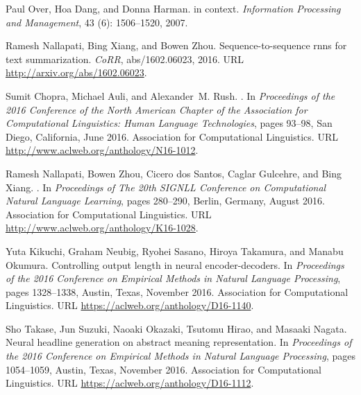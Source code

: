 \documentclass[11pt]{article}
\begin{document}
\begin{thebibliography}{23}
Paul Over, Hoa Dang, and Donna Harman.
 in context.
\newblock \emph{Information Processing and Management}, 43
  (6): 1506--1520, 2007.

Ramesh Nallapati, Bing Xiang, and Bowen Zhou.
\newblock Sequence-to-sequence rnns for text summarization.
\newblock \emph{CoRR}, abs/1602.06023, 2016{}.
\newblock URL \url{http://arxiv.org/abs/1602.06023}.

Sumit Chopra, Michael Auli, and Alexander~M. Rush.
.
\newblock In \emph{Proceedings of the 2016 Conference of the North American
  Chapter of the Association for Computational Linguistics: Human Language
  Technologies}, pages 93--98, San Diego, California, June 2016. Association
  for Computational Linguistics.
\newblock URL \url{http://www.aclweb.org/anthology/N16-1012}.

Ramesh Nallapati, Bowen Zhou, Cicero dos Santos, Caglar Gulcehre, and Bing
  Xiang.
.
\newblock In \emph{Proceedings of The 20th SIGNLL Conference on Computational
  Natural Language Learning}, pages 280--290, Berlin, Germany, August
  2016{}. Association for Computational Linguistics.
\newblock URL \url{http://www.aclweb.org/anthology/K16-1028}.

Yuta Kikuchi, Graham Neubig, Ryohei Sasano, Hiroya Takamura, and Manabu
  Okumura.
\newblock Controlling output length in neural encoder-decoders.
\newblock In \emph{Proceedings of the 2016 Conference on Empirical Methods in
  Natural Language Processing}, pages 1328--1338, Austin, Texas, November 2016.
  Association for Computational Linguistics.
\newblock URL \url{https://aclweb.org/anthology/D16-1140}.

Sho Takase, Jun Suzuki, Naoaki Okazaki, Tsutomu Hirao, and Masaaki Nagata.
\newblock Neural headline generation on abstract meaning representation.
\newblock In \emph{Proceedings of the 2016 Conference on Empirical Methods in
  Natural Language Processing}, pages 1054--1059, Austin, Texas, November 2016.
  Association for Computational Linguistics.
\newblock URL \url{https://aclweb.org/anthology/D16-1112}.


\end{thebibliography}
\end{document}

